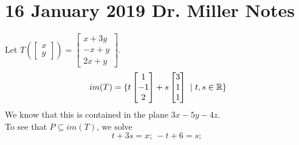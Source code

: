 \section{16 January 2019 Dr. Miller Notes}
\begin{ex}
Let $T(\begin{bmatrix}
x\\y
\end{bmatrix})=\begin{bmatrix}
x+3y\\
-x+y\\
2x+y
\end{bmatrix}$.
\[im(T)=\{t\begin{bmatrix}
1\\-1\\2
\end{bmatrix}+s\begin{bmatrix}
3\\
1\\
1
\end{bmatrix}\ |\ t,s\in \mathbb{R}\}\]
We know that this is contained in the plane $3x-5y-4z$.\\
To see that $P\subseteq im(T)$, we solve
\[t+3s=x;\ -t+6=s;\ \]
\end{ex}
